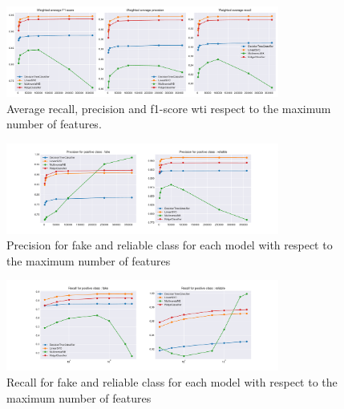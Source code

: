 \begin{figure}
 \centering
 \includegraphics[width=0.8\textwidth]{images/chapitre3/ML_fake_average}
 \caption{Average recall, precision and f1-score wti respect to the maximum number of features.}
 \label{fig:chap3:max_feat1}
\end{figure}
\begin{figure}
 \centering
 \includegraphics[width=0.8\textwidth]{images/chapitre3/ML_fake_precision}
 \caption{Precision for fake and reliable class for each model with respect to the maximum number of features}
 \label{fig:chap3:max_feat2}
\end{figure}
\begin{figure}
 \centering
 \includegraphics[width=0.8\textwidth]{images/chapitre3/ML_fake_recall}
 \caption{Recall for fake and reliable class for each model with respect to the maximum number of features}
 \label{fig:chap3:max_feat3}
\end{figure}

